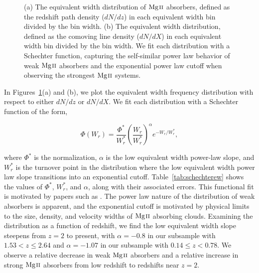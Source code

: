 \documentclass[iop,apj,numberedappendix,appendixfloats,twocolappendix]{emulateapj}
\begin{document}
\begin{figure*}[bth]
\caption{(a) The equivalent width distribution of ${\hbox{{\rm Mg}\kern 0.1em{\sc ii}}}$ absorbers, defined as the redshift path density ($dN\!/dz$) in each equivalent width bin divided by the bin width. (b) The equivalent width distribution, defined as the comoving line density ($dN\!/dX$) in each equivalent width bin divided by the bin width. We fit each distribution with a Schechter function, capturing the self-similar power law behavior of weak ${\hbox{{\rm Mg}\kern 0.1em{\sc ii}}}$ absorbers and the exponential power law cutoff when observing the strongest ${\hbox{{\rm Mg}\kern 0.1em{\sc ii}}}$ systems.}
\label{fig:ewdistro}
\end{figure*}

In Figures~\ref{fig:ewdistro}(a) and (b), we plot the equivalent width frequency distribution with respect to either $dN\!/dz$ or $dN\!/dX$. We fit each distribution with a Schechter function of the form,

\begin{equation}
\Phi (W_r) = \frac{\Phi^*}{W_r^*} \left(\frac{W_r}{W_r^*}\right)^{\alpha} e^{-W_r / W_r^*} ,
\label{eqn:schechter}
\end{equation}

where $\Phi^*$ is the normalization, $\alpha$ is the low equivalent width power-law slope, and $W_r^*$ is the turnover point in the distribution where the low equivalent width power law slope transitions into an exponential cutoff. Table~\ref{tab:schechterew} shows the values of $\Phi^*$, $W_r^*$, and $\alpha$, along with their associated errors. This functional fit is motivated by papers such as \cite{Kacprzak2011MgII}. The power law nature of the distribution of weak absorbers is apparent, and the exponential cutoff is motivated by physical limits to the size, density, and velocity widths of ${\hbox{{\rm Mg}\kern 0.1em{\sc ii}}}$ absorbing clouds. Examining the distribution as a function of redshift, we find the low equivalent width slope steepens from $z = 2$ to present, with $\alpha = -0.8$ in our subsample with $1.53 < z \le 2.64$ and $\alpha = -1.07$ in our subsample with $0.14 \le z < 0.78$. We observe a relative decrease in weak ${\hbox{{\rm Mg}\kern 0.1em{\sc ii}}}$ absorbers and a relative increase in strong ${\hbox{{\rm Mg}\kern 0.1em{\sc ii}}}$ absorbers from low redshift to redshifts near $z = 2$. 

\end{document}
